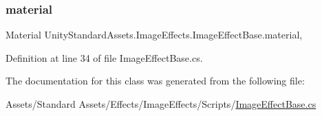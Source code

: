 \subsubsection{\texorpdfstring{material}{material}}
{\footnotesize\ttfamily Material Unity\+Standard\+Assets.\+Image\+Effects.\+Image\+Effect\+Base.\+material\hspace{0.3cm}{\ttfamily [get]}, {\ttfamily [protected]}}



Definition at line 34 of file Image\+Effect\+Base.\+cs.



The documentation for this class was generated from the following file\+:\begin{DoxyCompactItemize}
\item 
Assets/\+Standard Assets/\+Effects/\+Image\+Effects/\+Scripts/\mbox{\hyperlink{_image_effect_base_8cs}{Image\+Effect\+Base.\+cs}}\end{DoxyCompactItemize}
